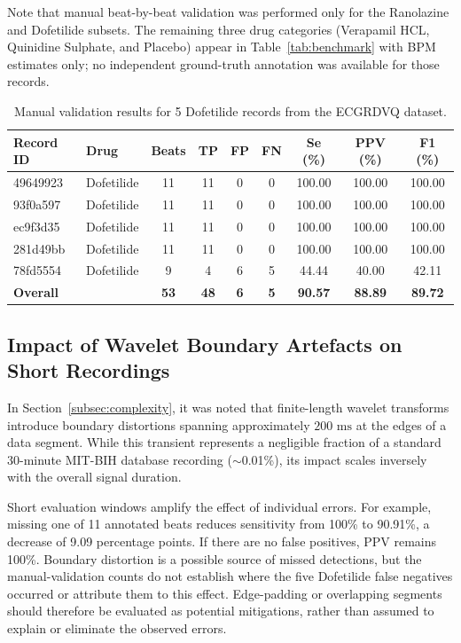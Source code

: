 \documentclass[11pt]{article}
\begin{document}
Note that manual beat-by-beat validation was performed only for the Ranolazine and Dofetilide subsets. The remaining three drug categories (Verapamil HCL, Quinidine Sulphate, and Placebo) appear in Table~\ref{tab:benchmark} with BPM estimates only; no independent ground-truth annotation was available for those records.

\begin{table}[h]
\centering
\caption{Manual validation results for 5 Dofetilide records from the ECGRDVQ dataset.}
\label{tab:manual_validation_dofetilide}
\begin{tabular}{llccccccc}
\toprule
\textbf{Record ID} & \textbf{Drug} & \textbf{Beats} & \textbf{TP} & \textbf{FP} & \textbf{FN} & \textbf{Se (\%)} & \textbf{PPV (\%)} & \textbf{F1 (\%)} \\
\midrule
49649923 & Dofetilide & 11 & 11 & 0 & 0 & 100.00 & 100.00 & 100.00 \\
93f0a597 & Dofetilide & 11 & 11 & 0 & 0 & 100.00 & 100.00 & 100.00 \\
ec9f3d35 & Dofetilide & 11 & 11 & 0 & 0 & 100.00 & 100.00 & 100.00 \\
281d49bb & Dofetilide & 11 & 11 & 0 & 0 & 100.00 & 100.00 & 100.00 \\
78fd5554 & Dofetilide & 9 & 4 & 6 & 5 & 44.44 & 40.00 & 42.11 \\
\midrule
\textbf{Overall} & & \textbf{53} & \textbf{48} & \textbf{6} & \textbf{5} & \textbf{90.57} & \textbf{88.89} & \textbf{89.72} \\
\bottomrule
\end{tabular}
\end{table}


\subsection{Impact of Wavelet Boundary Artefacts on Short Recordings}
In Section~\ref{subsec:complexity}, it was noted that finite-length wavelet transforms introduce boundary distortions spanning approximately $200\text{ ms}$ at the edges of a data segment. While this transient represents a negligible fraction of a standard 30-minute MIT-BIH database recording ($\sim$0.01\%), its impact scales inversely with the overall signal duration.  

Short evaluation windows amplify the effect of individual errors. For example, missing one of 11 annotated beats reduces sensitivity from 100\% to 90.91\%, a decrease of 9.09 percentage points. If there are no false positives, PPV remains 100\%. Boundary distortion is a possible source of missed detections, but the manual-validation counts do not establish where the five Dofetilide false negatives occurred or attribute them to this effect. Edge-padding or overlapping segments should therefore be evaluated as potential mitigations, rather than assumed to explain or eliminate the observed errors.
\end{document}
